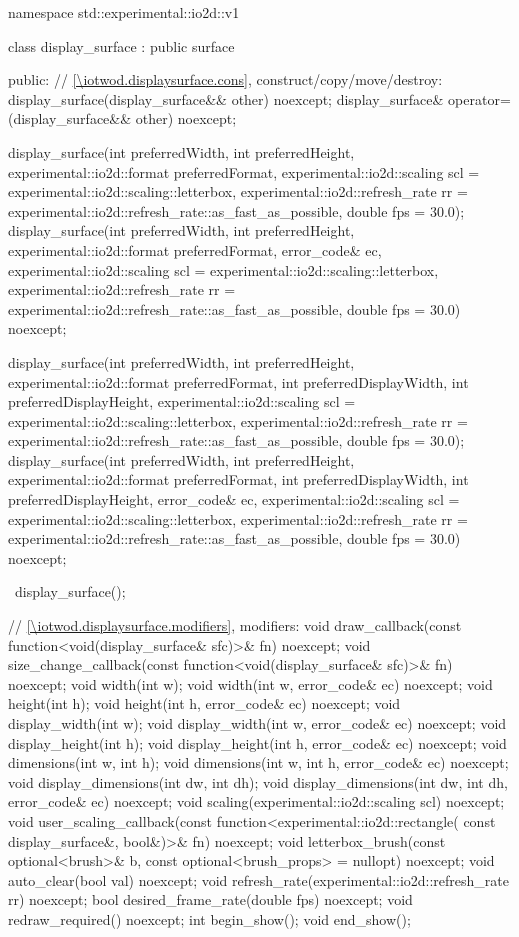 \begin{codeblock}
namespace std::experimental::io2d::v1 {
  class display_surface : public surface {
  public:
    // \ref{\iotwod.displaysurface.cons}, construct/copy/move/destroy:
    display_surface(display_surface&& other) noexcept;
    display_surface& operator=(display_surface&& other) noexcept;
    
    display_surface(int preferredWidth, int preferredHeight, 
      experimental::io2d::format preferredFormat,
      experimental::io2d::scaling scl = experimental::io2d::scaling::letterbox,
      experimental::io2d::refresh_rate rr =
      experimental::io2d::refresh_rate::as_fast_as_possible, double fps = 30.0);
    display_surface(int preferredWidth, int preferredHeight, 
      experimental::io2d::format preferredFormat, error_code& ec,
      experimental::io2d::scaling scl = experimental::io2d::scaling::letterbox,
      experimental::io2d::refresh_rate rr =
      experimental::io2d::refresh_rate::as_fast_as_possible, double fps = 30.0) 
      noexcept;
    
    display_surface(int preferredWidth, int preferredHeight, 
      experimental::io2d::format preferredFormat,
      int preferredDisplayWidth, int preferredDisplayHeight,
      experimental::io2d::scaling scl = experimental::io2d::scaling::letterbox,
      experimental::io2d::refresh_rate rr =
      experimental::io2d::refresh_rate::as_fast_as_possible, double fps = 30.0);
    display_surface(int preferredWidth, int preferredHeight, 
      experimental::io2d::format preferredFormat,
      int preferredDisplayWidth, int preferredDisplayHeight, error_code& ec,
      experimental::io2d::scaling scl = experimental::io2d::scaling::letterbox,
      experimental::io2d::refresh_rate rr =
      experimental::io2d::refresh_rate::as_fast_as_possible, double fps = 30.0) 
      noexcept;
    
    ~display_surface();
    
    // \ref{\iotwod.displaysurface.modifiers}, modifiers:
    void draw_callback(const function<void(display_surface& sfc)>& fn) noexcept;
    void size_change_callback(const function<void(display_surface& sfc)>& fn)
      noexcept;
    void width(int w);
    void width(int w, error_code& ec) noexcept;
    void height(int h);
    void height(int h, error_code& ec) noexcept;
    void display_width(int w);
    void display_width(int w, error_code& ec) noexcept;
    void display_height(int h);
    void display_height(int h, error_code& ec) noexcept;
    void dimensions(int w, int h);
    void dimensions(int w, int h, error_code& ec) noexcept;
    void display_dimensions(int dw, int dh);
    void display_dimensions(int dw, int dh, error_code& ec) noexcept;
    void scaling(experimental::io2d::scaling scl) noexcept;
    void user_scaling_callback(const function<experimental::io2d::rectangle(
      const display_surface&, bool&)>& fn) noexcept;
    void letterbox_brush(const optional<brush>& b,
      const optional<brush_props> = nullopt) noexcept;
    void auto_clear(bool val) noexcept;
    void refresh_rate(experimental::io2d::refresh_rate rr) noexcept;
    bool desired_frame_rate(double fps) noexcept;
    void redraw_required() noexcept;
    int begin_show();
    void end_show();
    
}}
\end{codeblock}
